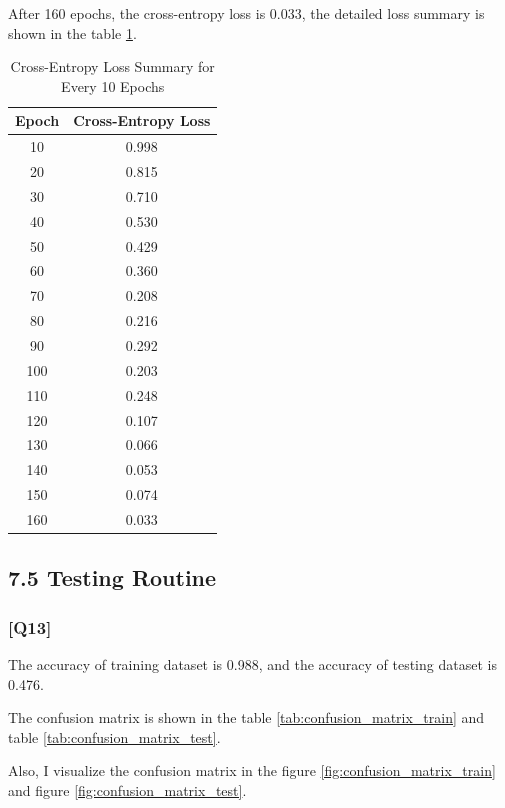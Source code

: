 \documentclass{article}
\begin{document}
After 160 epochs, the cross-entropy loss is 0.033, the detailed loss summary is shown in the table \ref{tab:cross_entropy_loss}.
\begin{table}[ht]
    \centering
    \caption{Cross-Entropy Loss Summary for Every 10 Epochs}
    \begin{tabular}{cc}
    \toprule
    Epoch & Cross-Entropy Loss \\
    \midrule
    10  & 0.998 \\
    20  & 0.815 \\
    30  & 0.710 \\
    40  & 0.530 \\
    50  & 0.429 \\
    60  & 0.360 \\
    70  & 0.208 \\
    80  & 0.216 \\
    90  & 0.292 \\
    100  & 0.203 \\
    110 & 0.248 \\
    120 & 0.107 \\
    130 & 0.066 \\
    140 & 0.053 \\
    150 & 0.074 \\
    160 & 0.033 \\
    \bottomrule
    \end{tabular}
    \label{tab:cross_entropy_loss}
\end{table}



\subsection*{7.5 Testing Routine}

\subsubsection*{[Q13]}

The accuracy of training dataset is 0.988, and the accuracy of testing dataset is 0.476.

The confusion matrix is shown in the table \ref{tab:confusion_matrix_train} and table \ref{tab:confusion_matrix_test}.

Also, I visualize the confusion matrix in the figure \ref{fig:confusion_matrix_train} and figure \ref{fig:confusion_matrix_test}.
\end{document}
